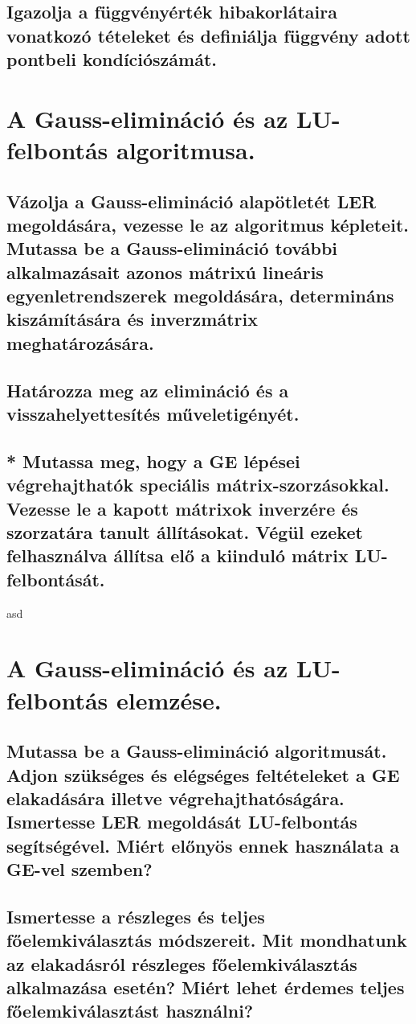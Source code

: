 \documentclass{article}
\begin{document}
        \subsection{Igazolja a függvényérték hibakorlátaira vonatkozó tételeket és definiálja függvény adott pontbeli kondíciószámát.}


    \section{A Gauss-elimináció és az LU-felbontás algoritmusa.}
        \subsection{Vázolja a Gauss-elimináció alapötletét LER megoldására, vezesse le az algoritmus képleteit. Mutassa be a Gauss-elimináció további alkalmazásait azonos mátrixú lineáris egyenletrendszerek megoldására, determináns kiszámítására és inverzmátrix meghatározására.}
        \subsection{Határozza meg az elimináció és a visszahelyettesítés műveletigényét.}
        \subsection{* Mutassa meg, hogy a GE lépései végrehajthatók speciális mátrix-szorzásokkal. Vezesse le a kapott mátrixok inverzére és szorzatára tanult állításokat. Végül ezeket felhasználva állítsa elő a kiinduló mátrix LU-felbontását.}
asd

    \section{A Gauss-elimináció és az LU-felbontás elemzése.}
        \subsection{Mutassa be a Gauss-elimináció algoritmusát. Adjon szükséges és elégséges feltételeket a GE elakadására illetve végrehajthatóságára. Ismertesse LER megoldását LU-felbontás segítségével. Miért előnyös ennek használata a GE-vel szemben?}
        \subsection{Ismertesse a részleges és teljes főelemkiválasztás módszereit. Mit mondhatunk az elakadásról részleges főelemkiválasztás alkalmazása esetén? Miért lehet érdemes teljes főelemkiválasztást használni?}
\end{document}
